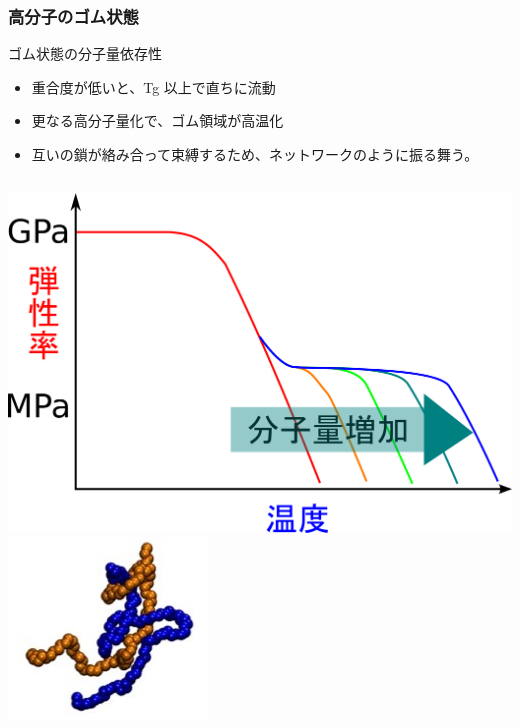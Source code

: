 \documentclass[12pt, dvipdfmx]{beamer}
\begin{document}
\begin{frame}
	\frametitle{高分子のゴム状態}
			\begin{exampleblock}{ゴム状態の分子量依存性}
				\begin{itemize}
					\item 重合度が低いと、Tg 以上で直ちに流動
					\item 更なる高分子量化で、ゴム領域が高温化
					\item 互いの鎖が絡み合って束縛するため、ネットワークのように振る舞う。
				\end{itemize}
			\end{exampleblock}
			\vspace{3mm}
			\begin{columns}[c, onlytextwidth]
					\centering
					\includegraphics[width=.9\textwidth]{polymer_spectrum_2.png}
				\centering
				\includegraphics[width=.8\textwidth]{karamiai.png}
			\end{columns}
\end{frame}
\end{document}
